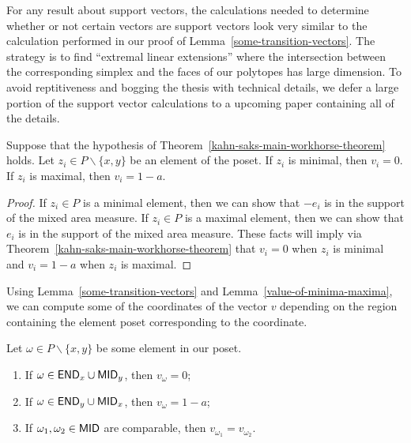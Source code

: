 \documentclass{puthesis-UG}
\begin{document}
For any result about support vectors, the calculations needed to determine whether or not certain vectors are support vectors look very similar to the calculation performed in our proof of Lemma~\ref{some-transition-vectors}. The strategy is to find ``extremal linear extensions'' where the intersection between the corresponding simplex and the faces of our polytopes has large dimension. To avoid reptitiveness and bogging the thesis with technical details, we defer a large portion of the support vector calculations to a upcoming paper containing all of the details. 

\begin{lem} \label{value-of-minima-maxima}
    Suppose that the hypothesis of Theorem~\ref{kahn-saks-main-workhorse-theorem} holds. Let $z_i \in P \backslash \{x, y\}$ be an element of the poset. If $z_i$ is minimal, then $v_i = 0$. If $z_i$ is maximal, then $v_i = 1-a$. 
\end{lem}

\begin{proof}
	If $z_i \in P$ is a minimal element, then we can show that $-e_i$ is in the support of the mixed area measure. If $z_i \in P$ is a maximal element, then we can show that $e_i$ is in the support of the mixed area measure. These facts will imply via Theorem~\ref{kahn-saks-main-workhorse-theorem} that $v_i = 0$ when $z_i$ is minimal and $v_i = 1-a$ when $z_i$ is maximal. 
\end{proof}

Using Lemma~\ref{some-transition-vectors} and Lemma~\ref{value-of-minima-maxima}, we can compute some of the coordinates of the vector $v$ depending on the region containing the element poset corresponding to the coordinate.  

\begin{cor} \label{cor-coordinates-in-the-regions}
    Let $\omega \in P \backslash \{x, y\}$ be some element in our poset. 
    \begin{enumerate}[label = (\alph*)]
        \item If $\omega \in \mathsf{END}_x \cup \mathsf{MID}_y$, then $v_\omega = 0$;
        \item If $\omega \in \mathsf{END}_y \cup \mathsf{MID}_x$, then $v_\omega = 1-a$;
        \item If $\omega_1, \omega_2 \in \mathsf{MID}$ are comparable, then $v_{\omega_1} = v_{\omega_2}$.
    \end{enumerate}
\end{cor}
\end{document}
